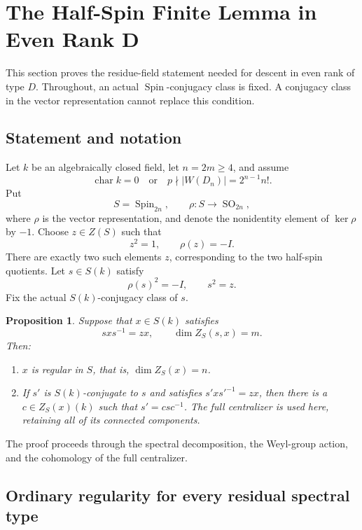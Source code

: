\documentclass[11pt,a4paper]{article}
\newtheorem{proposition}[theorem]{Proposition}
\theoremstyle{definition}
\theoremstyle{remark}
\begin{document}
\section{The Half-Spin Finite Lemma in Even Rank D}
\label{sec:even-d}

This section proves the residue-field statement needed for descent in
even rank of type \(D\). Throughout, an actual
\(\operatorname{Spin}\)-conjugacy class is fixed. A conjugacy class in
the vector representation cannot replace this condition.

\subsection{Statement and notation}

Let \(k\) be an algebraically closed field, let \(n=2m\geq 4\), and assume
\[
\operatorname{char}k=0
\quad\text{or}\quad
p\nmid |W(D_n)|=2^{n-1}n!.
\]
Put
\[
S=\operatorname{Spin}_{2n},
\qquad
\rho:S\longrightarrow\operatorname{SO}_{2n},
\]
where \(\rho\) is the vector representation, and denote the nonidentity
element of \(\ker\rho\) by \(-1\). Choose \(z\in Z(S)\) such that
\[
z^2=1,\qquad \rho(z)=-I.
\]
There are exactly two such elements \(z\), corresponding to the two
half-spin quotients. Let \(s\in S(k)\) satisfy
\[
\rho(s)^2=-I,\qquad s^2=z.
\]
Fix the actual \(S(k)\)-conjugacy class of \(s\).

\begin{proposition}
\label{prop:even-d-finite}
Suppose that \(x\in S(k)\) satisfies
\[
sxs^{-1}=zx,
\qquad
\dim Z_S(s,x)=m.
\]
Then:
\begin{enumerate}
\item \(x\) is regular in \(S\), that is,
      \(\dim Z_S(x)=n\).
\item If \(s'\) is \(S(k)\)-conjugate to \(s\) and satisfies
      \(s'xs'^{-1}=zx\), then there is a
      \(c\in Z_S(x)(k)\) such that \(s'=csc^{-1}\).
      The full centralizer is used here, retaining all of its connected
      components.
\end{enumerate}
\end{proposition}

The proof proceeds through the spectral decomposition, the Weyl-group
action, and the cohomology of the full centralizer.

\subsection{Ordinary regularity for every residual spectral type}
\end{document}
